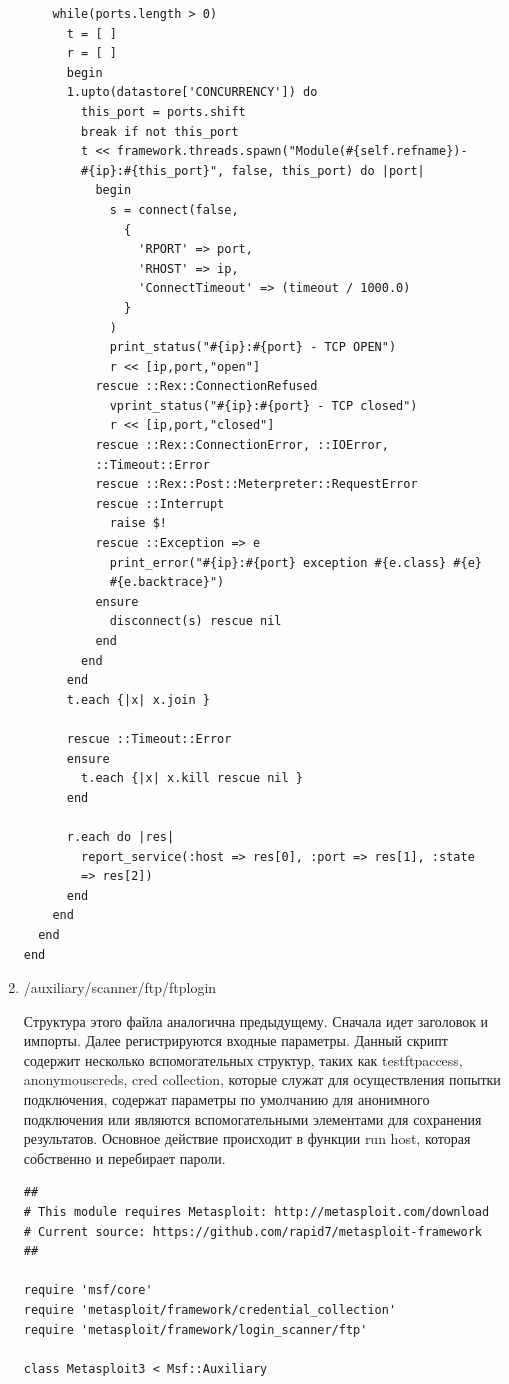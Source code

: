 \documentclass{article}
\begin{document}
\begin{enumerate}
\begin{verbatim}
    while(ports.length > 0)
      t = [ ]
      r = [ ]
      begin
      1.upto(datastore['CONCURRENCY']) do
        this_port = ports.shift
        break if not this_port
        t << framework.threads.spawn("Module(#{self.refname})-
        #{ip}:#{this_port}", false, this_port) do |port|
          begin
            s = connect(false,
              {
                'RPORT' => port,
                'RHOST' => ip,
                'ConnectTimeout' => (timeout / 1000.0)
              }
            )
            print_status("#{ip}:#{port} - TCP OPEN")
            r << [ip,port,"open"]
          rescue ::Rex::ConnectionRefused
            vprint_status("#{ip}:#{port} - TCP closed")
            r << [ip,port,"closed"]
          rescue ::Rex::ConnectionError, ::IOError, 
          ::Timeout::Error
          rescue ::Rex::Post::Meterpreter::RequestError
          rescue ::Interrupt
            raise $!
          rescue ::Exception => e
            print_error("#{ip}:#{port} exception #{e.class} #{e} 
            #{e.backtrace}")
          ensure
            disconnect(s) rescue nil
          end
        end
      end
      t.each {|x| x.join }

      rescue ::Timeout::Error
      ensure
        t.each {|x| x.kill rescue nil }
      end

      r.each do |res|
        report_service(:host => res[0], :port => res[1], :state 
        => res[2])
      end
    end
  end
end
\end{verbatim}

\item /auxiliary/scanner/ftp/ftplogin

Структура этого файла аналогична предыдущему. Сначала идет заголовок и импорты. Далее регистрируются входные параметры. Данный скрипт содержит несколько вспомогательных структур, таких как testftpaccess, anonymouscreds, cred collection, которые служат для осуществления попытки подключения, содержат параметры по умолчанию для анонимного подключения или являются вспомогательными элементами для сохранения результатов. Основное действие происходит в функции run host, которая собственно и перебирает пароли.
\begin{verbatim}
##
# This module requires Metasploit: http://metasploit.com/download
# Current source: https://github.com/rapid7/metasploit-framework
##

require 'msf/core'
require 'metasploit/framework/credential_collection'
require 'metasploit/framework/login_scanner/ftp'

class Metasploit3 < Msf::Auxiliary


\end{verbatim}
\end{enumerate}
\end{document}

